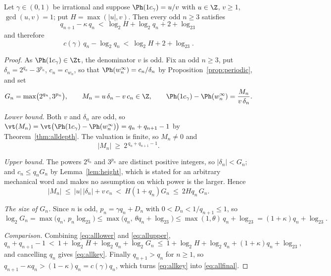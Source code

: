 \begin{theorem}\label{thm:allmain}
Let $\gamma\in(0,1)$ be irrational and suppose $\Ph(1c_\gamma)=u/v$ with
$u\in\Z$, $v\ge1$, $\gcd(u,v)=1$; put $H=\max(|u|,v)$. Then every odd $n\ge3$
satisfies
\begin{equation}\label{eq:allkey}
q_{n+1}-\kappa\, q_n\ <\ \log_2H+\log_2q_n+2+\log_23
\end{equation}
and therefore
\begin{equation}\label{eq:allfinal}
c(\gamma)\,q_n-\log_2q_n\ <\ \log_2H+2+\log_23 .
\end{equation}
\end{theorem}

\begin{proof}
As $\Ph(1c_\gamma)\in\Zt$, the denominator $v$ is odd. Fix an odd $n\ge3$, put
$\delta_n=2^{q_n}-3^{p_n}$, $c_n=c_{w_n}$, so that
$\Ph(w_n^\infty)=c_n/\delta_n$ by Proposition~\ref{prop:periodic}, and set
\[
G_n=\max\bigl(2^{q_n},3^{p_n}\bigr),\qquad
M_n=u\,\delta_n-v\,c_n\in\Z,\qquad
\Ph(1c_\gamma)-\Ph(w_n^\infty)=\frac{M_n}{v\,\delta_n}.
\]

\emph{Lower bound.} Both $v$ and $\delta_n$ are odd, so
$\vt(M_n)=\vt\bigl(\Ph(1c_\gamma)-\Ph(w_n^\infty)\bigr)=q_n+q_{n+1}-1$ by
Theorem~\ref{thm:alldepth}. The valuation is finite, so $M_n\ne0$ and
\begin{equation}\label{eq:alllower}
|M_n|\ \ge\ 2^{\,q_n+q_{n+1}-1}.
\end{equation}

\emph{Upper bound.} The powers $2^{q_n}$ and $3^{p_n}$ are distinct positive
integers, so $|\delta_n|<G_n$; and $c_n\le q_nG_n$ by Lemma~\ref{lem:height},
which is stated for an arbitrary mechanical word and makes no assumption on
which power is the larger. Hence
\begin{equation}\label{eq:allupper}
|M_n|\ \le\ |u|\,|\delta_n|+v\,c_n\ <\ H(1+q_n)G_n\ \le\ 2Hq_n\,G_n .
\end{equation}

\emph{The size of $G_n$.} Since $n$ is odd, $p_n=\gamma q_n+D_n$ with
$0<D_n<1/q_{n+1}\le1$, so
\[
\log_2G_n=\max\bigl(q_n,\ p_n\log_23\bigr)
\le\max\bigl(q_n,\ \theta q_n+\log_23\bigr)
\le\max(1,\theta)\,q_n+\log_23=(1+\kappa)q_n+\log_23 .
\]

\emph{Comparison.} Combining \eqref{eq:alllower} and \eqref{eq:allupper},
\[
q_n+q_{n+1}-1\ <\ 1+\log_2H+\log_2q_n+\log_2G_n
\ \le\ 1+\log_2H+\log_2q_n+(1+\kappa)q_n+\log_23 ,
\]
and cancelling $q_n$ gives \eqref{eq:allkey}. Finally $q_{n+1}>q_n$ for $n\ge1$,
so $q_{n+1}-\kappa q_n>(1-\kappa)q_n=c(\gamma)q_n$, which turns
\eqref{eq:allkey} into \eqref{eq:allfinal}.
\end{proof}

